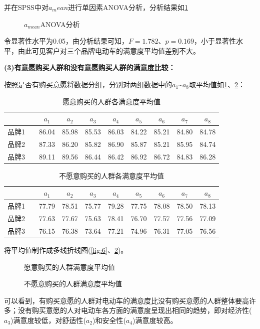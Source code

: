 \documentclass{JXUSTmodeling}
\begin{document}
并在SPSS中对$ a_mean $进行单因素ANOVA分析，分析结果如\ref{fig:5}
\begin{figure}[!htbp]
	\centering
	\caption{$ a_{mean} $ANOVA分析}
	\label{fig:5}
\end{figure}

令显著性水平为0.05，由分析结果可知，$ F = 1.782 $、$ p=0.169 $，小于显著性水平，由此可见客户对三个品牌电动车的满意度平均值差别不大。

\textbf{(3)有意愿购买人群和没有意愿购买人群的满意度比较：}


按照是否有购买意愿将数据分组，分别对两组数据中的$ a_{1} $\~{}$ a_{8} $取平均值如\ref{tab:jz1}、\ref{tab:jz2}：
\begin{table}[!htbp]
	\centering 
	\caption{\label{tab:jz1}愿意购买的人群各满意度平均值}
	\begin{tabular}{cccccccccc}
		\toprule[1.5pt]
		&&$ a_{1} $&$ a_{2} $&$ a_{3} $&$ a_{4} $&$ a_{5} $&$ a_{6} $&$ a_{7} $&$ a_{8} $ \\
		\midrule
		品牌1&&86.04&85.98&85.53&86.03&84.22&85.21&84.80&84.78 \\
		品牌2&&87.33&86.20&85.82&86.90&85.87&85.21&85.95&84.74 \\
		品牌3&&89.11&89.56&86.44&86.42&86.92&86.72&84.83&86.28 \\
		
		\bottomrule[1.5pt]
	\end{tabular}
\end{table}
\begin{table}[!htbp]
	\centering 
	\caption{\label{tab:jz2}不愿意购买的人群各满意度平均值}
	\begin{tabular}{cccccccccc}
		\toprule[1.5pt]
		&&$ a_{1} $&$ a_{2} $&$ a_{3} $&$ a_{4} $&$ a_{5} $&$ a_{6} $&$ a_{7} $&$ a_{8} $ \\
		\midrule
		品牌1&&77.79&78.51&75.77&79.28&77.75&78.08&78.50&78.13 \\
		品牌2&&77.63&77.67&75.63&78.41&76.70&77.57&77.56&77.09 \\
		品牌3&&76.15&76.38&73.64&77.21&74.96&76.31&77.05&76.56 \\
		
		\bottomrule[1.5pt]
	\end{tabular}
\end{table}

将平均值制作成多线折线图(\ref{fig:6}、\ref{fig:7})。
\begin{figure}[!htpb]
	\begin{minipage}{0.48\linewidth}
		\centering
		\caption{愿意购买的人群满意度平均值}
		\label{fig:6}
	\end{minipage}
	\begin{minipage}{0.48\linewidth}
		\centering
		\caption{不愿意购买的人群满意度平均值}
		\label{fig:7}
	\end{minipage}
	
\end{figure}
可以看到，有购买意愿的人群对电动车的满意度比没有购买意愿的人群整体要高许多；没有购买意愿的人对电动车各方面的满意度呈现出相同的趋势，即对经济性($ a_{3} $)满意度较低，对舒适性($ a_{2} $)和安全性($ a_{4} $)满意度较高。
\end{document}
